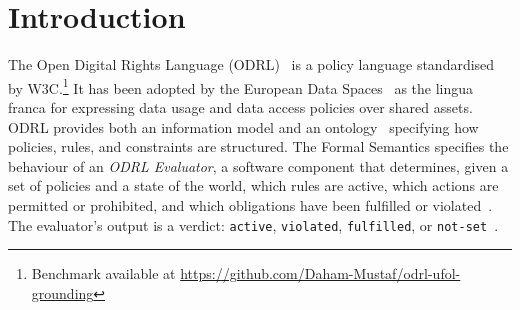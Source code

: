 \documentclass{IOS-Book-Article}
\theoremstyle{definition}
\begin{document}
\section{Introduction}
\label{sec:introduction}
The Open Digital Rights Language (ODRL)~\cite{iannella2018odrl} is
a policy language standardised by W3C.\footnote{Benchmark available at
\url{https://github.com/Daham-Mustaf/odrl-ufol-grounding}} It has been adopted by the European Data Spaces~\cite{otto2019international,theissen2023semantics,gaiax-policy-reasoning-2023} as the lingua franca for expressing data usage and data access policies over shared assets. ODRL provides both an information model and an
ontology~\cite{iannella2018odrl} specifying how policies, rules, and
constraints are structured. The Formal Semantics specifies the behaviour of an \emph{ODRL Evaluator}, a software
component that determines, given a set of policies and a state of
the world, which rules are active, which actions are permitted or
prohibited, and which obligations have been fulfilled or
violated~\cite{odrl-formal-semantics,salas2025odrl}.
The evaluator's output is a verdict: \texttt{active},
\texttt{violated}, \texttt{fulfilled}, or \texttt{not-set}~\cite{odrl-formal-semantics}.
\end{document}
